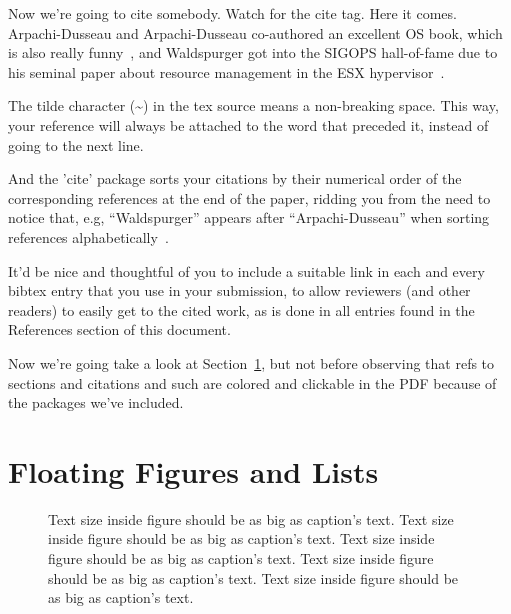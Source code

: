 \documentclass[letterpaper,twocolumn,10pt]{article}
\begin{document}
Now we're going to cite somebody. Watch for the cite tag. Here it
comes. Arpachi-Dusseau and Arpachi-Dusseau co-authored an excellent OS
book, which is also really funny~\cite{arpachiDusseau18:osbook}, and
Waldspurger got into the SIGOPS hall-of-fame due to his seminal paper
about resource management in the ESX hypervisor~\cite{waldspurger02,SLMDB}.

The tilde character (\~{}) in the tex source means a non-breaking
space. This way, your reference will always be attached to the word
that preceded it, instead of going to the next line.

And the 'cite' package sorts your citations by their numerical order
of the corresponding references at the end of the paper, ridding you
from the need to notice that, e.g, ``Waldspurger'' appears after
``Arpachi-Dusseau'' when sorting references
alphabetically~\cite{waldspurger02,arpachiDusseau18:osbook}. 

It'd be nice and thoughtful of you to include a suitable link in each
and every bibtex entry that you use in your submission, to allow
reviewers (and other readers) to easily get to the cited work, as is
done in all entries found in the References section of this document.

Now we're going take a look at Section~\ref{sec:figs}, but not before
observing that refs to sections and citations and such are colored and
clickable in the PDF because of the packages we've included.

\section{Floating Figures and Lists}
\label{sec:figs}


\begin{figure}
\begin{center}
\end{center}
\caption{\label{fig:vectors} Text size inside figure should be as big as
  caption's text. Text size inside figure should be as big as
  caption's text. Text size inside figure should be as big as
  caption's text. Text size inside figure should be as big as
  caption's text. Text size inside figure should be as big as
  caption's text. }
\end{figure}
\end{document}
